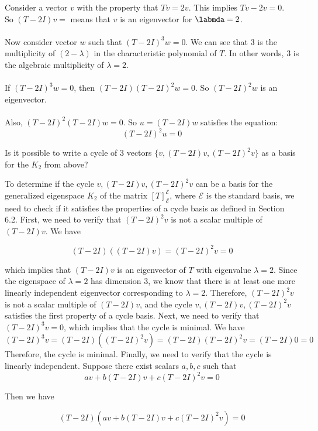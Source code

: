 \documentclass[fontsize=12pt]{scrartcl}
\begin{document}
\noindent
Consider a vector $v$ with the property that $Tv = 2v$. This implies $Tv - 2v = 0$.\\ 
So $(T-2I)v=$ means that $v$ is an eigenvector for $\labmda = 2$.\\
\\
Now consider vector $w$ such that $(T-2I)^3w = 0$. We can see that 3 is the\\
multiplicity of $(2-\lambda)$ in the characteristic polynomial of $T$. In other words, 3 is the algebraic multiplicity of $\lambda = 2$.\\
\\
If $(T - 2I)^3w = 0$, then $(T-2I)(T-2I)^2w = 0$. So $(T-2I)^2w$ is an eigenvector.\\
\\
Also, $(T-2I)^2(T-2I)w = 0$. So $u = (T-2I)w$ satisfies the equation:\\
$$(T-2I)^2u = 0$$

\medskip

\noindent
Is it possible to write a cycle of 3 vectors $\{v, (T-2I)v, (T-2I)^2v\}$ as a basis for the $K_2$ from above?



To determine if the cycle ${v, (T-2I)v, (T-2I)^2v}$ can be a basis for the generalized eigenspace $K_2$ of the matrix $[T]_{\mathcal{E}}^{\mathcal{E}}$, where $\mathcal{E}$ is the standard basis, we need to check if it satisfies the properties of a cycle basis as defined in Section 6.2.
First, we need to verify that $(T-2I)^2v$ is not a scalar multiple of $(T-2I)v$. We have

$$(T-2I)((T-2I)v) = (T-2I)^2v = 0$$

which implies that $(T-2I)v$ is an eigenvector of $T$ with eigenvalue $\lambda = 2$. Since the eigenspace of $\lambda = 2$ has dimension 3, we know that there is at least one more linearly independent eigenvector corresponding to $\lambda = 2$. Therefore, $(T-2I)^2v$ is not a scalar multiple of $(T-2I)v$, and the cycle ${v, (T-2I)v, (T-2I)^2v}$ satisfies the first property of a cycle basis.
Next, we need to verify that $(T-2I)^3v = 0$, which implies that the cycle is minimal. We have
$$(T-2I)^3v = (T-2I)((T-2I)^2v) = (T-2I)(T-2I)^2v = (T-2I)0 = 0$$
Therefore, the cycle is minimal.
Finally, we need to verify that the cycle is linearly independent. Suppose there exist scalars $a,b,c$ such that
$$av + b(T-2I)v + c(T-2I)^2v = 0$$

Then we have

$$(T-2I)(av + b(T-2I)v + c(T-2I)^2v) = 0$$
\end{document}
